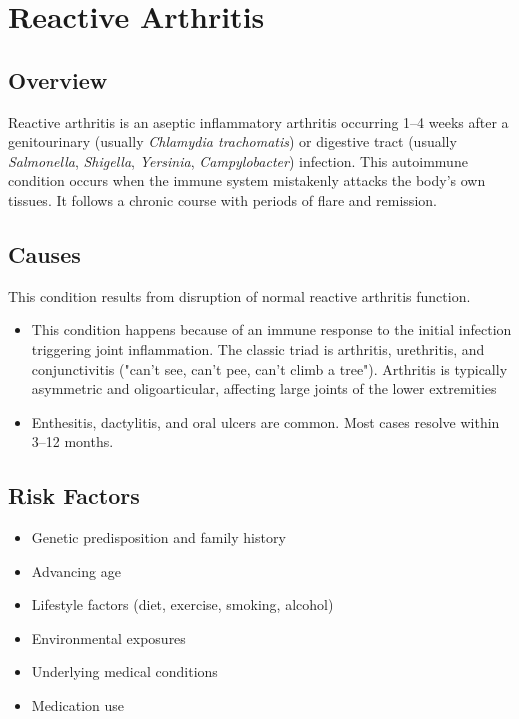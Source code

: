 \chapter{Reactive Arthritis}
\label{sec:Reactive Arthritis}

\section{Overview}
Reactive arthritis is an aseptic inflammatory arthritis occurring 1--4 weeks after a genitourinary (usually \textit{Chlamydia trachomatis}) or digestive tract (usually \textit{Salmonella}, \textit{Shigella}, \textit{Yersinia}, \textit{Campylobacter}) infection. This autoimmune condition occurs when the immune system mistakenly attacks the body's own tissues. It follows a chronic course with periods of flare and remission.
\section{Causes}
This condition results from disruption of normal reactive arthritis function.

\begin{itemize}[noitemsep]
  \item This condition happens because of an immune response to the initial infection triggering joint inflammation. The classic triad is arthritis, urethritis, and conjunctivitis ("can't see, can't pee, can't climb a tree"). Arthritis is typically asymmetric and oligoarticular, affecting large joints of the lower extremities
  \item Enthesitis, dactylitis, and oral ulcers are common. Most cases resolve within 3--12 months.
\end{itemize}
\section{Risk Factors}


\begin{itemize}[noitemsep]
  \item Genetic predisposition and family history
  \item Advancing age
  \item Lifestyle factors (diet, exercise, smoking, alcohol)
  \item Environmental exposures
  \item Underlying medical conditions
  \item Medication use
\end{itemize}
